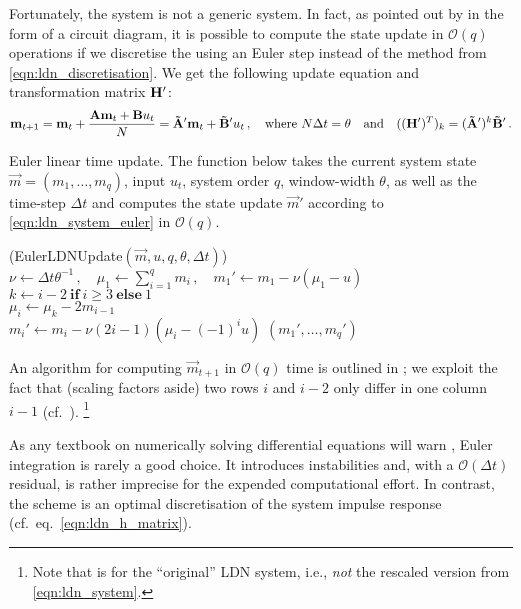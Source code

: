 Fortunately, the \LDN system is not a generic \LTI system.
In fact, as pointed out by \citet[Figure~6.6]{voelker2019} in the form of a circuit diagram, it is possible to compute the state update in $\mathcal{O}(q)$ operations if we discretise the \LDN using an Euler step instead of the \ZOH method from \cref{eqn:ldn_discretisation}.
We get the following update equation and transformation matrix $\mathbf{H}'$:%
\begin{align}
	\mathbf{m}_{t + 1} = \mathbf{m}_{t} + \frac{\mathbf{A} \mathbf{m}_{t} + \mathbf{B} u_t}{N} = \mathbf{\tilde A}' \mathbf{m}_t + \mathbf{\tilde B}' u_t \,,
	\quad \text{where } N \Delta t = \theta
	\quad \text{and} \quad
	((\mathbf{H}')^T)_k = (\mathbf{\tilde A}')^k \mathbf{\tilde B}' \,.
	\label{eqn:ldn_system_euler}
\end{align}
\begin{algorithm}[t]
	\begin{minipage}{0.98\textwidth}
	\caption[Euler linear time LDN update]{Euler linear time \LDN update. The function below takes the current \LDN system state $\vec m = (m_1, \ldots, m_q)$, input $u_t$, system order $q$, window-width $\theta$, as well as the time-step $\Delta t$ and computes the state update $\vec m'$ according to \cref{eqn:ldn_system_euler} in $\mathcal{O}(q)$.
	}
	\label{alg:ldn_euler}
	\end{minipage}
	\sffamily\small
	\Begin(EulerLDNUpdate${(\vec m, u, q, \theta, \Delta t)}$)
	{
		$\nu \gets \Delta t \theta^{-1} \,, \quad \mu_1 \gets \sum\nolimits_{i = 1}^q m_i \,, \quad m_1' \gets m_1 - \nu (\mu_1 - u)$ \\
		{
			$k \gets i - 2~\mathbf{if}~i \geq 3~\mathbf{else}~1$\\
			$\mu_i \gets \mu_k - 2 m_{i - 1}$ \\
			$m_i' \gets m_i - \nu (2i - 1)  (\mu_i - (-1)^i u)$
		}
		\Return $(m_1', \ldots, m_q')$
	}
\end{algorithm}%
An algorithm for computing $\vec m_{t + 1}$ in $\mathcal{O}(q)$ time is outlined in ; we exploit the fact that (scaling factors aside) two rows $i$ and $i - 2$ only differ in one column $i - 1$ (cf.~).%
\footnote{Note that  is for the \enquote{original} LDN system, i.e., \emph{not} the rescaled version from \cref{eqn:ldn_system}.}

As any textbook on numerically solving differential equations will warn \citep[e.g.,][Chapter~17.1]{press2007numerical}, Euler integration is rarely a good choice.
It introduces instabilities and, with a $\mathcal{O}(\Delta t)$ residual, is rather imprecise for the expended computational effort.
In contrast, the \ZOH scheme is an optimal discretisation of the system impulse response (cf.~eq.~\ref{eqn:ldn_h_matrix}).

